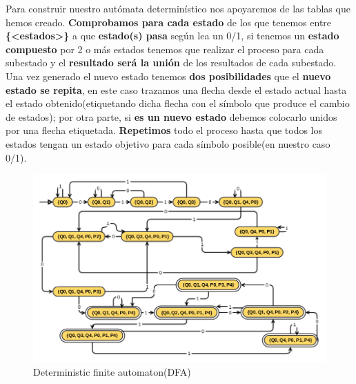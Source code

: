Para construir nuestro autómata determinístico nos apoyaremos de las tablas que hemos creado. \textbf{Comprobamos para cada estado} de los que tenemos entre \textbf{\{<estados>\}} a que \textbf{estado(s) pasa} según lea un 0/1, si tenemos un \textbf{estado compuesto} por 2 o más estados tenemos que realizar el proceso para cada subestado y el \textbf{resultado será la unión} de los resultados de cada subestado. Una vez generado el nuevo estado tenemos \textbf{dos posibilidades} que el \textbf{nuevo estado se repita}, en este caso trazamos una flecha desde el estado actual hasta el estado obtenido(etiquetando dicha flecha con el símbolo que produce el cambio de estados); por otra parte, si \textbf{es un nuevo estado} debemos colocarlo unidos por una flecha etiquetada. \textbf{Repetimos} todo el proceso hasta que todos los estados tengan un estado objetivo para cada símbolo posible(en nuestro caso 0/1).

\begin{figure}[H]
	\includegraphics[scale=0.55]{prac3.png}
	\caption{Deterministic finite automaton(DFA)}
\end{figure}




